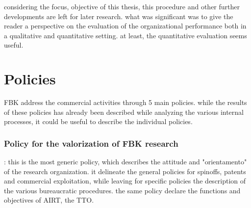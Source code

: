considering the focus, objective of this thesis, this procedure and other further developments are left for later research. what was significant was to give the reader a perspective on the evaluation of the organizational performance both in a qualitative and quantitative setting. at least, the quantitative evaluation seems useful.

\section{Policies}

FBK address the commercial activities through 5 main policies. while the results of these policies has already been described while analyzing the various internal processes, it could be useful to describe the individual policies.

\subsubsection{Policy for the valorization of FBK research}: this is the most generic policy, which describes the attitude and "orientamento" of the research organization. it delineate the general policies for spinoffs, patents and commercial exploitation, while leaving for specific policies the description of the various bureaucratic procedures. the same policy declare the functions and objectives of AIRT, the TTO.

